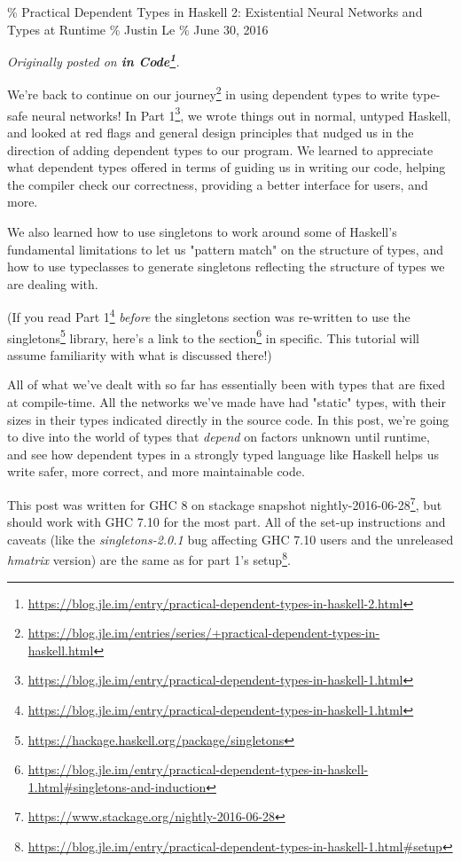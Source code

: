 \documentclass[]{article}
\renewcommand{\href}[2]{#2\footnote{\url{#1}}}
\begin{document}
\% Practical Dependent Types in Haskell 2: Existential Neural Networks and Types
at Runtime \% Justin Le \% June 30, 2016

\emph{Originally posted on
\textbf{\href{https://blog.jle.im/entry/practical-dependent-types-in-haskell-2.html}{in
Code}}.}

We're back to continue on
\href{https://blog.jle.im/entries/series/+practical-dependent-types-in-haskell.html}{our
journey} in using dependent types to write type-safe neural networks! In
\href{https://blog.jle.im/entry/practical-dependent-types-in-haskell-1.html}{Part
1}, we wrote things out in normal, untyped Haskell, and looked at red flags and
general design principles that nudged us in the direction of adding dependent
types to our program. We learned to appreciate what dependent types offered in
terms of guiding us in writing our code, helping the compiler check our
correctness, providing a better interface for users, and more.

We also learned how to use singletons to work around some of Haskell's
fundamental limitations to let us "pattern match" on the structure of types, and
how to use typeclasses to generate singletons reflecting the structure of types
we are dealing with.

(If you read
\href{https://blog.jle.im/entry/practical-dependent-types-in-haskell-1.html}{Part
1} \emph{before} the singletons section was re-written to use the
\href{https://hackage.haskell.org/package/singletons}{singletons} library,
\href{https://blog.jle.im/entry/practical-dependent-types-in-haskell-1.html\#singletons-and-induction}{here's
a link to the section} in specific. This tutorial will assume familiarity with
what is discussed there!)

All of what we've dealt with so far has essentially been with types that are
fixed at compile-time. All the networks we've made have had "static" types, with
their sizes in their types indicated directly in the source code. In this post,
we're going to dive into the world of types that \emph{depend} on factors
unknown until runtime, and see how dependent types in a strongly typed language
like Haskell helps us write safer, more correct, and more maintainable code.

This post was written for GHC 8 on stackage snapshot
\href{https://www.stackage.org/nightly-2016-06-28}{nightly-2016-06-28}, but
should work with GHC 7.10 for the most part. All of the set-up instructions and
caveats (like the \emph{singletons-2.0.1} bug affecting GHC 7.10 users and the
unreleased \emph{hmatrix} version) are the same as for
\href{https://blog.jle.im/entry/practical-dependent-types-in-haskell-1.html\#setup}{part
1's setup}.
\end{document}
